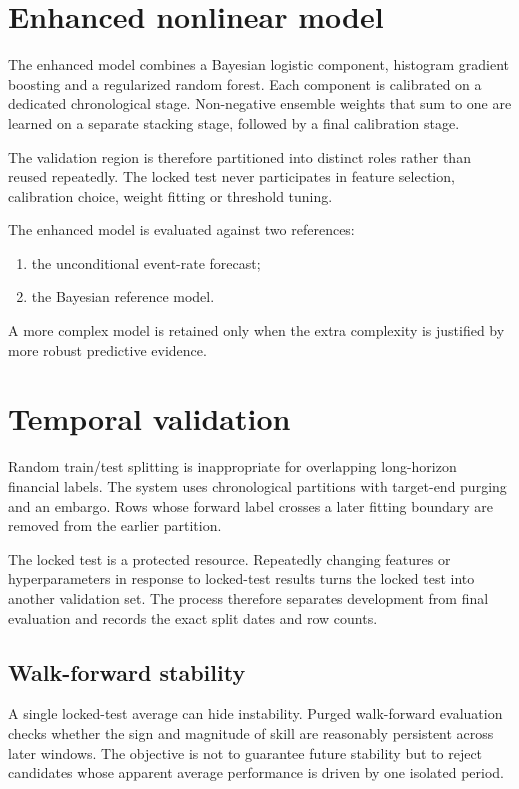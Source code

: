 \documentclass[11pt]{article}
\begin{document}
\section{Enhanced nonlinear model}
The enhanced model combines a Bayesian logistic component, histogram gradient boosting and a regularized random forest. Each component is calibrated on a dedicated chronological stage. Non-negative ensemble weights that sum to one are learned on a separate stacking stage, followed by a final calibration stage.

The validation region is therefore partitioned into distinct roles rather than reused repeatedly. The locked test never participates in feature selection, calibration choice, weight fitting or threshold tuning.

The enhanced model is evaluated against two references:
\begin{enumerate}[itemsep=0.2em]
\item the unconditional event-rate forecast;
\item the Bayesian reference model.
\end{enumerate}
A more complex model is retained only when the extra complexity is justified by more robust predictive evidence.

\section{Temporal validation}
Random train/test splitting is inappropriate for overlapping long-horizon financial labels. The system uses chronological partitions with target-end purging and an embargo. Rows whose forward label crosses a later fitting boundary are removed from the earlier partition.

The locked test is a protected resource. Repeatedly changing features or hyperparameters in response to locked-test results turns the locked test into another validation set. The process therefore separates development from final evaluation and records the exact split dates and row counts.

\subsection{Walk-forward stability}
A single locked-test average can hide instability. Purged walk-forward evaluation checks whether the sign and magnitude of skill are reasonably persistent across later windows. The objective is not to guarantee future stability but to reject candidates whose apparent average performance is driven by one isolated period.
\end{document}
